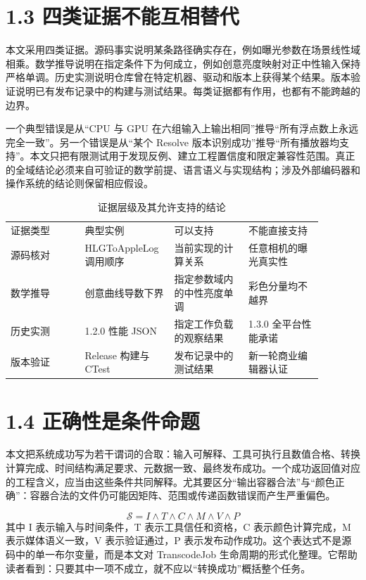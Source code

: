 \documentclass[UTF8,zihao=-4,openany]{ctexbook}
\begin{document}
\section*{1.3 四类证据不能互相替代}
本文采用四类证据。源码事实说明某条路径确实存在，例如曝光参数在场景线性域相乘。数学推导说明在指定条件下为何成立，例如创意亮度映射对正中性输入保持严格单调。历史实测说明仓库曾在特定机器、驱动和版本上获得某个结果。版本验证说明已有发布记录中的构建与测试结果。每类证据都有作用，也都有不能跨越的边界。

一个典型错误是从“CPU 与 GPU 在六组输入上输出相同”推导“所有浮点数上永远完全一致”。另一个错误是从“某个 Resolve 版本识别成功”推导“所有播放器均支持”。本文只把有限测试用于发现反例、建立工程置信度和限定兼容性范围。真正的全域结论必须来自可验证的数学前提、语言语义与实现结构；涉及外部编码器和操作系统的结论则保留相应假设。


\begin{longtable}{p{0.22\linewidth}p{0.22\linewidth}p{0.22\linewidth}p{0.22\linewidth}}
\caption{证据层级及其允许支持的结论}\\
\toprule
证据类型 & 典型实例 & 可以支持 & 不能直接支持\\
源码核对 & HLGToAppleLog 调用顺序 & 当前实现的计算关系 & 任意相机的曝光真实性\\
数学推导 & 创意曲线导数下界 & 指定参数域内的中性亮度单调 & 彩色分量均不越界\\
历史实测 & 1.2.0 性能 JSON & 指定工作负载的观察结果 & 1.3.0 全平台性能承诺\\
版本验证 & Release 构建与 CTest & 发布记录中的测试结果 & 新一轮商业编辑器认证\\
\bottomrule
\end{longtable}

\section*{1.4 正确性是条件命题}
本文把系统成功写为若干谓词的合取：输入可解释、工具可执行且数值合格、转换计算完成、时间结构满足要求、元数据一致、最终发布成功。一个成功返回值对应的工程含义，应当由这些条件共同解释。尤其要区分“输出容器合法”与“颜色正确”：容器合法的文件仍可能因矩阵、范围或传递函数错误而产生严重偏色。


\begin{equation}
\mathcal{S}=I\land T\land C\land M\land V\land P
\end{equation}
其中 I 表示输入与时间条件，T 表示工具信任和资格，C 表示颜色计算完成，M 表示媒体语义一致，V 表示验证通过，P 表示发布动作成功。这个表达式不是源码中的单一布尔变量，而是本文对 TranscodeJob 生命周期的形式化整理。它帮助读者看到：只要其中一项不成立，就不应以“转换成功”概括整个任务。
\end{document}

